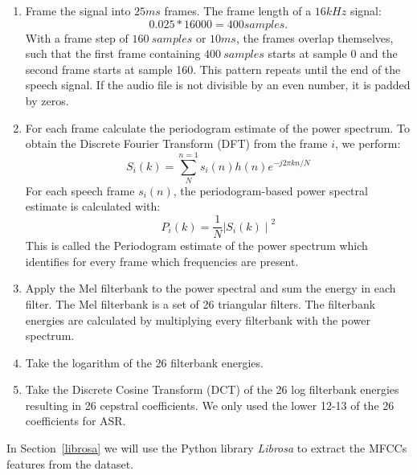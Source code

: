 \begin{enumerate}[label=\arabic*.]
  \item Frame the signal into $25ms$ frames. The frame length of a $16kHz$
    signal:
  \begin{equation} 
    0.025*16000 = 400 samples.
  \end{equation}
  With a frame step of $160\ samples$ or $10ms$, the frames overlap themselves,
  such that the first frame containing $400\ samples$ starts at sample 0 and the
  second frame starts at sample 160. This pattern repeats until the end of the
  speech signal. If the audio file is not divisible by an even number, it is
  padded by zeros.\\
  \item For each frame calculate the periodogram estimate of the power spectrum.
    To obtain the Discrete Fourier Transform (DFT) from the frame $i$, we
    perform:
    \begin{equation}
      S_{i}(k) = \sum_{N}^{n=1}s_i(n)h(n)e^{-j2\pi kn/N}
    \end{equation}
    For each speech frame $s_{i}(n)$, the periodogram-based power spectral
    estimate is calculated with:
    \begin{equation}
      P_{i}(k)=\frac{1}{N}{\mid{S_{i}(k)}\mid}^{2}
    \end{equation}
  This is called the Periodogram estimate of the power spectrum which identifies
  for every frame which frequencies are present.\\
  \item Apply the Mel filterbank to the power spectral and sum the energy in
    each filter. The Mel filterbank is a set of 26 triangular filters. The
    filterbank energies are calculated by multiplying every filterbank with the
    power spectrum.\\
  \item Take the logarithm of the 26 filterbank energies.\\
  \item Take the Discrete Cosine Transform (DCT) of the 26 log filterbank
    energies resulting in 26 cepstral coefficients. We only used the lower 12-13
    of the 26 coefficients for ASR.\\
\end{enumerate}

In Section~\ref{librosa} we will use the Python library \textit{Librosa} to
extract the MFCCs features from the dataset.
